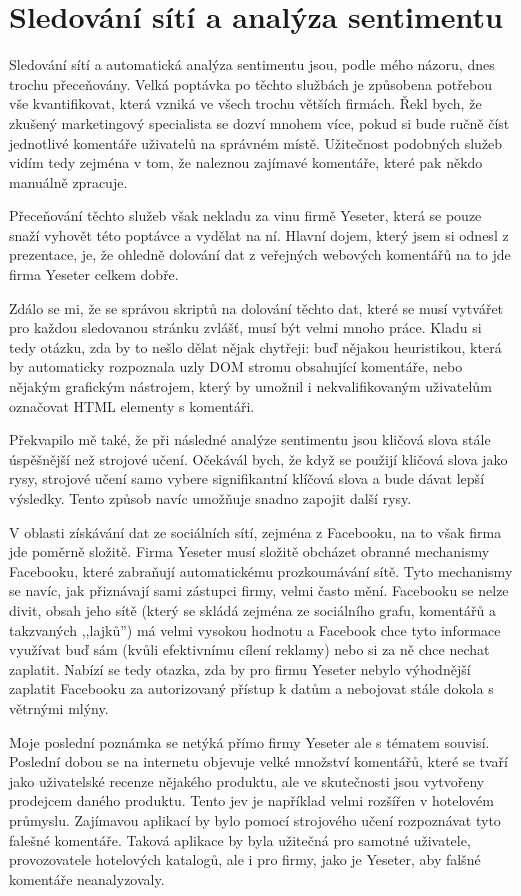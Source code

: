 \documentclass[12pt,a4paper]{report}
\begin{document}
\section*{Sledování sítí a analýza sentimentu}

Sledování sítí a automatická analýza sentimentu jsou, podle mého názoru, dnes
trochu přeceňovány. Velká poptávka po těchto službách je způsobena potřebou vše
kvantifikovat, která vzniká ve všech trochu větších firmách.  Řekl bych, že
zkušený marketingový specialista se dozví mnohem více, pokud si bude ručně
číst jednotlivé komentáře uživatelů na správném místě. Užitečnost podobných
služeb vidím tedy zejména v tom, že naleznou zajímavé komentáře, které pak
někdo manuálně zpracuje. 

Přeceňování těchto služeb však nekladu za vinu firmě Yeseter, která se pouze
snaží vyhovět této poptávce a vydělat na ní. Hlavní dojem, který jsem si odnesl
z prezentace, je, že ohledně dolování dat z veřejných webových komentářů na to
jde firma Yeseter celkem dobře. 

Zdálo se mi, že se správou skriptů na dolování těchto dat, které se musí
vytvářet pro každou sledovanou stránku zvlášť, musí být velmi mnoho práce.
Kladu si tedy otázku, zda by to nešlo dělat nějak chytřeji: buď nějakou
heuristikou, která by automaticky rozpoznala uzly DOM stromu obsahující
komentáře, nebo nějakým grafickým nástrojem, který by umožnil i
nekvalifikovaným uživatelům označovat HTML elementy s komentáři.

Překvapilo mě také, že při následné analýze sentimentu jsou kličová slova stále
úspěšnější než strojové učení. Očekávál bych, že když se použijí kličová slova
jako rysy, strojové učení samo vybere signifikantní klíčová slova a bude dávat
lepší výsledky. Tento způsob navíc umožňuje snadno zapojit další rysy. 

V oblasti získávání dat ze sociálních sítí, zejména z Facebooku, na to však
firma jde poměrně složitě. Firma Yeseter musí složitě obcházet obranné
mechanismy Facebooku, které zabraňují automatickému prozkoumávání sítě.  Tyto
mechanismy se navíc, jak přiznávají sami zástupci firmy, velmi často mění.
Facebooku se nelze divit, obsah jeho sítě (který se skládá zejména ze
sociálního grafu, komentářů a takzvaných ,,lajků'') má velmi vysokou hodnotu a
Facebook chce tyto informace využívat buď sám (kvůli efektivnímu cílení
reklamy) nebo si za ně chce nechat zaplatit.  Nabízí se tedy otazka, zda by pro
firmu Yeseter nebylo výhodnější zaplatit Facebooku za autorizovaný přístup k
datům a nebojovat stále dokola s větrnými mlýny.

Moje poslední poznámka se netýká přímo firmy Yeseter ale s tématem souvisí.
Poslední dobou se na internetu objevuje velké množství komentářů, které se
tvaří jako uživatelské recenze nějakého produktu, ale ve skutečnosti jsou
vytvořeny prodejcem daného produktu. Tento jev je například velmi rozšířen v
hotelovém průmyslu. Zajímavou aplikací by bylo pomocí strojového učení
rozpoznávat tyto falešné komentáře. Taková aplikace by byla užitečná pro
samotné uživatele, provozovatele hotelových katalogů, ale i pro firmy, jako je
Yeseter, aby falšné komentáře neanalyzovaly. 
\end{document}
